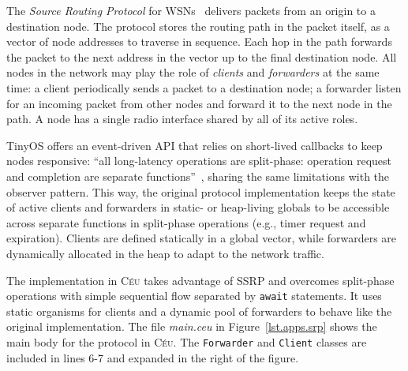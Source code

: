 \documentclass{sigplanconf}
\newcommand{\CEU}{\textsc{C\'{e}u}\xspace}
\newcommand{\code}[1] {{\small{\texttt{#1}}}}
\newcommand{\1}{\;}
\newcommand{\2}{\;\;}
\newcommand{\3}{\;\;\;}
\newcommand{\5}{\;\;\;\;\;}
\begin{document}
The \emph{Source Routing Protocol} for WSNs~\cite{wsn.teps} delivers packets 
from an origin to a destination node.
The protocol stores the routing path in the packet itself, as a vector of node 
addresses to traverse in sequence.
Each hop in the path forwards the packet to the next address in the vector up 
to the final destination node.
%
All nodes in the network may play the role of \emph{clients} and 
\emph{forwarders} at the same time:
%
a client periodically sends a packet to a destination node;
a forwarder listen for an incoming packet from other nodes and forward it to 
the next node in the path.
%
A node has a single radio interface shared by all of its active roles.

TinyOS offers an event-driven API that relies on short-lived callbacks to keep 
nodes responsive:
``all long-latency operations are split-phase: operation request and completion 
are separate functions''~\cite{wsn.nesc}, sharing the same limitations with the 
observer pattern.
%
This way, the original protocol implementation keeps the state of active 
clients and forwarders in static- or heap-living globals to be accessible 
across separate functions in split-phase operations (e.g., timer request and 
expiration).
%
Clients are defined statically in a global vector, while forwarders are 
dynamically allocated in the heap to adapt to the network traffic.

The implementation in \CEU takes advantage of SSRP and overcomes split-phase 
operations with simple sequential flow separated by \code{await} statements.
It uses static organisms for clients and a dynamic pool of forwarders to behave 
like the original implementation.
%
The file \emph{main.ceu} in Figure~\ref{lst.apps.srp} shows the main body for 
the protocol in \CEU.
The \code{Forwarder} and \code{Client} classes are included in lines 6-7 and 
expanded in the right of the figure.
\end{document}
